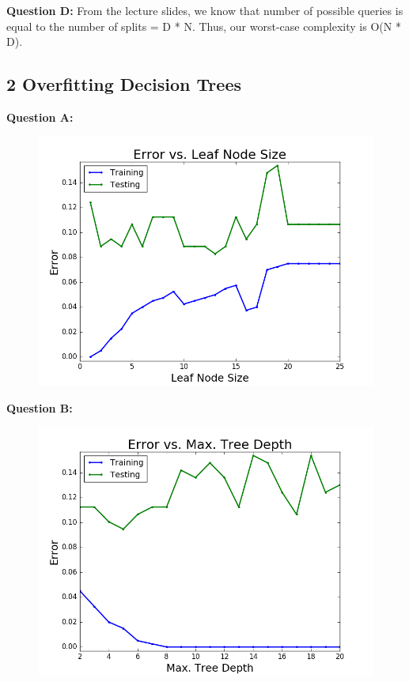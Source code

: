 \documentclass[12 pt]{article}
\begin{document}
	\noindent\textbf{Question D:} From the lecture slides, we know that number of possible queries is equal to the number of splits = D * N. Thus, our worst-case complexity is O(N * D). \\
	
 
	
	\subsection*{2 Overfitting Decision Trees}
	\noindent\textbf{Question A:} 
	\begin{figure}[H]
		\includegraphics[width=13cm]{leafNode}
	\end{figure}	
	
	\noindent\textbf{Question B:} 
	\begin{figure}[H]
		\includegraphics[width=13cm]{maxTreeDepth}
	\end{figure}	
\end{document}
